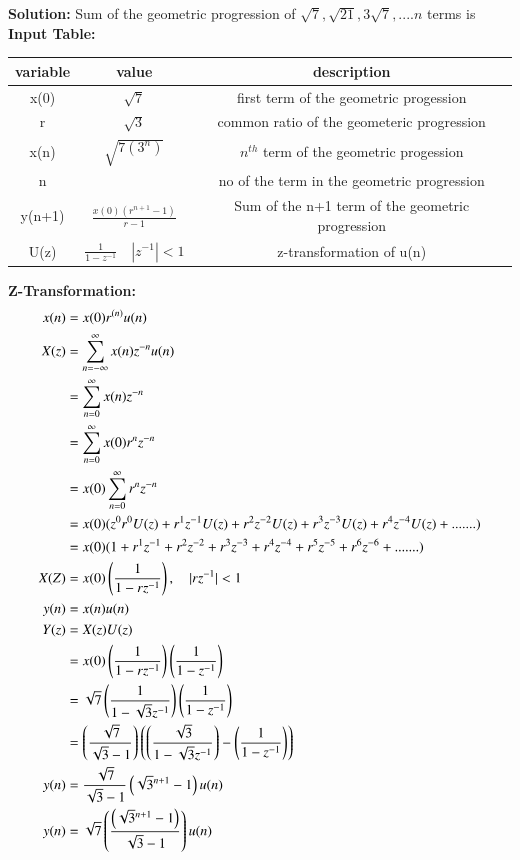 \documentclass[a4,12pt,onecolumn]{IEEEtran}
\begin{document}
\textbf{Solution:}
 Sum of the geometric progression of $\sqrt{7}, \sqrt{21}, 3\sqrt{7},....n$ terms is\\
 \textbf{Input Table:}
 \begin{center}
\begin{tabular}{|c|c|c|}
   \hline
   variable&value&description  \\
   \hline
   x(0) & $ \sqrt{7} $& first term of the geometric progession\\
   \hline
   r & $\sqrt{3}$ & common ratio of the geometeric progression\\
   \hline
   x(n) & $\sqrt{7(3^{n})}$& $n^{th}$ term of the geometric progession\\
   \hline
   n& &no of the term in the geometric progression\\
   \hline
   y(n+1) &$\frac{x(0)(r^{n+1}-1)}{r-1}$ &Sum of the n+1 term of the geometric progression\\
   \hline 
   U(z)&$\frac{1}{1-z^{-1}} \quad{|z^{-1}|<1}$&z-transformation of u(n)\\
   \hline
\end{tabular}
\end{center}
\textbf{\large{Z-Transformation:}}
\begin{align}
   x(n) &= x(0)r^{(n)}u(n) \\
    X(z) &= \sum_{n=-\infty}^{\infty} x(n)z^{-n}u(n)\\
&=\sum_{n=0}^{\infty} x(n)z^{-n} \\
&=\sum_{n=0}^{\infty} x(0)r^nz^{-n} \\ 
&=x(0)\sum_{n=0}^{\infty} r^nz^{-n} \\ 
&=x(0)(z^0r^0U(z)+ r^1z^{-1}U(z)+r^2z^{-2}U(z)+r^3z^{-3}U(z)+r^4z^{-4}U(z)+.......)\\
&= x(0)(1+r^1z^{-1}+r^2z^{-2}+r^3z^{-3}+r^4z^{-4}+r^5z^{-5}+r^6z^{-6}+.......)\\
X(Z)&=x(0)\left(\frac{1}{1-rz^{-1}}\right),\quad{|rz^{-1}|<1}\\
y(n)&=x(n)u(n)\\
Y(z)&=X(z)U(z)\\
&=x(0)\left(\frac{1}{1-rz^{-1}}\right)\left(\frac{1}{1-z^{-1}}\right)\\
&=\sqrt{7}\left(\frac{1}{1-\sqrt{3}z^{-1}}\right)\left(\frac{1}{1-z^{-1}}\right)\\
&=\left(\frac{\sqrt{7}}{\sqrt{3}-1}\right)\left(\left(\frac{\sqrt{3}}{1-\sqrt{3}z^{-1}}\right)-\left(\frac{1}{1-z^{-1}}\right)\right)\\
y(n)&=\frac{\sqrt{7}}{\sqrt{3}-1}\left(\sqrt{3}^{n+1}-1\right)u(n)\\
y(n)&=\sqrt{7}\left(\frac{\left(\sqrt{3}^{n+1}-1\right)}{\sqrt{3}-1}\right)u(n)\end{align}
\end{document}
